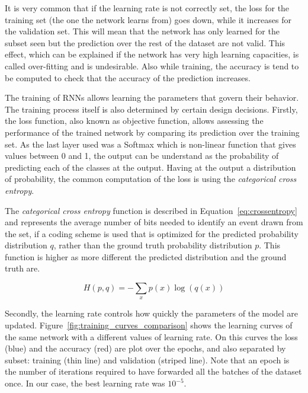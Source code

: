 It is very common that if the learning rate is not correctly set, the loss for the training set (the one the network learns from) goes down, while it increases for the validation set. This will mean that the network has only learned for the subset seen but the prediction over the rest of the dataset are not valid. This effect, which can be explained if the network has very high learning capacities, is called over-fitting and is undesirable. Also while training, the accuracy is tend to be computed to check that the accuracy of the prediction increases.

The training of RNNs allows learning the parameters that govern their behavior. The training process itself is also determined by certain design decisions.
Firstly, the loss function, also known as objective function, allows assessing the performance of the trained network by comparing its prediction over the training set. As the last layer used was a Softmax which is non-linear function that gives values between 0 and 1, the output can be understand as the probability of predicting each of the classes at the output. Having at the output a distribution of probability, the common computation of the loss is using the \textit{categorical cross entropy}.

The \textit{categorical cross entropy} function is described in Equation~\ref{eq:crossentropy} and represents the average number of bits needed to identify an event drawn from the set, if a coding scheme is used that is optimized for the predicted probability distribution $q$, rather than the ground truth probability distribution $p$. This function is higher as more different the predicted distribution and the ground truth are.

\begin{equation}
\label{eq:crossentropy}
	H(p,q) = - \sum_x p(x) \log(q(x))
\end{equation}

Secondly, the learning rate controls how quickly the parameters of the model are updated.
Figure~\ref{fig:training_curves_comparison} shows the learning curves of the same network with a different values of learning rate. On this curves the loss (blue) and the accuracy (red) are plot over the epochs, and also separated by subset: training (thin line) and validation (striped line). Note that an epoch is the number of iterations required to have forwarded all the batches of the dataset once. In our case, the best learning rate was $10^{-5}$.

